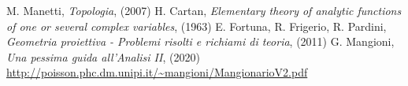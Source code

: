 \begin{thebibliography}{widest entry}
   M. Manetti, \textit{Topologia}, (2007)
   H. Cartan, \textit{Elementary theory of analytic functions of one or several complex variables}, (1963)
   E. Fortuna, R. Frigerio, R. Pardini, \textit{Geometria proiettiva - Problemi risolti e richiami di teoria}, (2011)
   G. Mangioni, \textit{Una pessima guida all'Analisi II}, (2020) \url{http://poisson.phc.dm.unipi.it/~mangioni/MangionarioV2.pdf}
\end{thebibliography}
